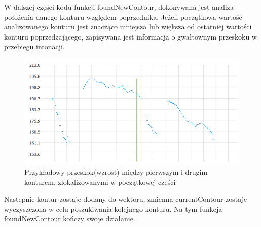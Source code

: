 \documentclass[a4paper,12 pt]{article}
\begin{document}
W dalszej części kodu funkcji foundNewContour, dokonywana jest analiza położenia danego konturu względem poprzednika. Jeżeli początkowa wartość analizowanego konturu jest znacząco mniejsza lub większa od ostatniej wartości konturu poprzedzającego, zapisywana jest informacja o gwałtownym przeskoku w przebiegu intonacji.
 \FloatBarrier
\begin{figure}[h]
\centering
\includegraphics[scale=0.7]{przeskok.png}
\caption{Przykładowy przeskok(wzrost) między pierwszym i drugim konturem, zlokalizowanymi w początkowej części}
\end{figure}
\FloatBarrier
Następnie kontur zostaje dodany do wektoru,  zmienna currentContour zostaje wyczyszczona w celu poszukiwania kolejnego konturu. Na tym funkcja foundNewContour kończy swoje działanie.
\end{document}
